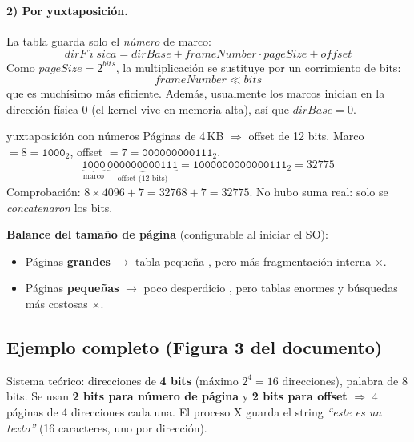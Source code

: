 \documentclass[11pt,letterpaper]{article}
\begin{document}
\paragraph{2) Por yuxtaposici\'on.} La tabla guarda solo el \emph{n\'umero} de marco:
\[ \mathit{dirF\acute{\imath}sica} = \mathit{dirBase} + \mathit{frameNumber}\cdot \mathit{pageSize} + \mathit{offset} \]
Como $\mathit{pageSize}=2^{\mathit{bits}}$, la multiplicaci\'on se sustituye por un corrimiento de bits:
\[ \mathit{frameNumber} \ll \mathit{bits} \]
que es much\'isimo m\'as eficiente. Adem\'as, usualmente los marcos inician en la direcci\'on f\'isica 0 (el kernel vive en memoria alta), as\'i que $\mathit{dirBase}=0$.

\begin{ejemplo}{yuxtaposici\'on con n\'umeros}
P\'aginas de 4\,KB $\Rightarrow$ offset de 12 bits. Marco $= 8 = \mathtt{1000}_2$, offset $= 7 = \mathtt{000000000111}_2$.
\[ \underbrace{\mathtt{1000}}_{\text{marco}}\,\underbrace{\mathtt{000000000111}}_{\text{offset (12 bits)}} = \mathtt{1000000000000111}_2 = 32775 \]
Comprobaci\'on: $8 \times 4096 + 7 = 32768 + 7 = 32775$. \checkmark\; No hubo suma real: solo se \emph{concatenaron} los bits.
\end{ejemplo}

\begin{ojo}
\textbf{Balance del tama\~no de p\'agina} (configurable al iniciar el SO):
\begin{itemize}[nosep]
  \item P\'aginas \textbf{grandes} $\rightarrow$ tabla peque\~na \checkmark, pero m\'as fragmentaci\'on interna $\times$.
  \item P\'aginas \textbf{peque\~nas} $\rightarrow$ poco desperdicio \checkmark, pero tablas enormes y b\'usquedas m\'as costosas $\times$.
\end{itemize}
\end{ojo}

\subsection{Ejemplo completo (Figura 3 del documento)}

Sistema te\'orico: direcciones de \textbf{4 bits} (m\'aximo $2^4=16$ direcciones), palabra de 8 bits. Se usan \textbf{2 bits para n\'umero de p\'agina} y \textbf{2 bits para offset} $\Rightarrow$ 4 p\'aginas de 4 direcciones cada una. El proceso X guarda el string \emph{``este es un texto''} (16 caracteres, uno por direcci\'on).
\end{document}
